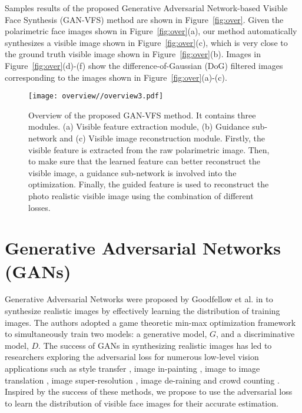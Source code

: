 \documentclass[10pt,twocolumn,letterpaper]{article}
\begin{document}
Samples results of the proposed Generative Adversarial Network-based Visible Face Synthesis (GAN-VFS) method are shown in Figure~\ref{fig:over}.  Given the polarimetric face images shown in Figure~\ref{fig:over}(a), our method automatically synthesizes a visible image shown in Figure~\ref{fig:over}(c), which is very close to the ground truth visible image shown in Figure~\ref{fig:over}(b).  Images in Figure~\ref{fig:over}(d)-(f) show the difference-of-Gaussian (DoG) filtered images corresponding to the images shown in Figure~\ref{fig:over}(a)-(c).



\begin{figure*}[t]
\centering
\texttt{[image: overview//overview3.pdf]}
\vskip-20pt \caption{Overview of the proposed GAN-VFS method.  It contains three modules. (a) Visible feature extraction module, (b) Guidance sub-network and (c) Visible image reconstruction module. Firstly, the visible feature is extracted from the raw polarimetric image.  Then, to make sure that the learned feature can better reconstruct the visible image, a guidance sub-network is involved into the optimization. Finally, the guided feature is used to reconstruct the photo realistic visible image using the combination of different losses.}
\label{fig:overview}
\end{figure*}






\section{Generative Adversarial Networks (GANs)}
Generative Adversarial Networks were proposed by Goodfellow et al. in \cite{GAN} to synthesize realistic images by effectively learning the distribution of training images.  The authors adopted a game theoretic min-max optimization framework to simultaneously train two models: a generative model, $G$, and a discriminative model, $D$.   The success of GANs in synthesizing realistic images has led to researchers exploring the adversarial loss for numerous low-level vision  applications such as style transfer \cite{li2016precomputed}, image in-painting \cite{pathak2016context}, image to image translation \cite{reed2016generative}, image super-resolution \cite{GAN_sisr}, image de-raining \cite{derain_2017_zhang} and crowd counting \cite{croudgan}. Inspired by the success of these methods, we propose to use the adversarial loss to learn the distribution of visible face images for their accurate estimation.
\end{document}
